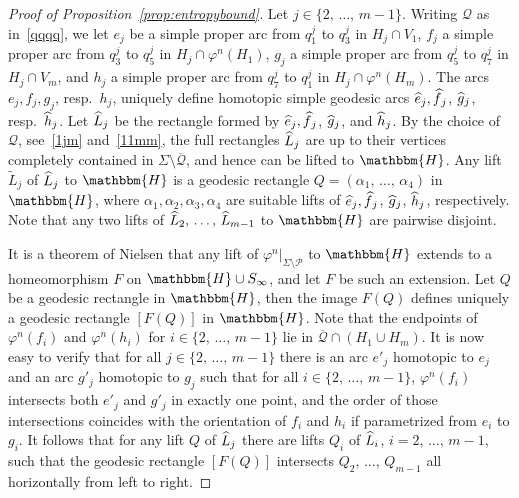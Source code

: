 \documentclass[AHL,Unicode,longabstracts,published]{cedram}
\newcommand{\Hy}{\mathbbm{H}}
\newcommand{\clP}{\mathcal{P}}
\newcommand{\clQ}{\mathcal{Q}}
\let\oldhat\hat
\renewcommand*{\hat}[1]{\mathchoice{\widehat{#1}}{\widehat{#1}}{\oldhat{#1}}{\oldhat{#1}}}
\begin{document}
\begin{proof}[Proof of Proposition~\ref{prop:entropybound}]
Let $j \in \{2,\,\ldots,\,m-1\}$. Writing $\clQ$ as in~\eqref{qqqq}, we let $e_j$ be a simple proper arc from $q_1^j$ to $q_3^j$ in $H_j \cap V_1$, $f_j$ a simple proper arc from $q_3^j$ to $q_5^j$ in $H_j \cap \varphi^n(H_1)$, $g_j$ a simple proper arc from $q_5^j$ to $q_7^j$ in $ H_j\cap V_m$, and $h_j$ a simple proper arc from $q_7^j$ to $q_1^j$ in $H_j \cap \varphi^n(H_m)$. The arcs $e_j, f_j, g_j$, resp.\ $h_j$, uniquely define homotopic simple geodesic arcs $\hat{e}_j, \hat{f}_j$, $\hat{g}_j$, resp.\ $\hat{h}_j$. Let $\hat{L}_j$ be the rectangle formed by $\hat{e}_j, \hat{f}_j$, $\hat{g}_j$, and $\hat{h}_j$. By the choice of $\clQ$, see~\eqref{1jm} and~\eqref{11mm}, the full rectangles $\hat{L}_j$ are up to their vertices completely contained in $\Sigma \setminus \overline{\clQ}$, and hence can be lifted to $\Hy$. Any lift $\widetilde{L}_j$ of $\hat{L}_j$ to $\Hy$ is a geodesic rectangle $Q=(\alpha_1,\, \ldots,\, \alpha_4)$ in $\Hy$, where $\alpha_1, \alpha_2, \alpha_3, \alpha_4$ are suitable lifts of $\hat{e}_j, \hat{f}_j$, $\hat{g}_j$, $\hat{h}_j$, respectively. Note that any two lifts of $\hat{L}_2,\,\ldots,\, \hat{L}_{m-1}$ to $\Hy$ are pairwise disjoint.


It is a theorem of Nielsen that any lift of $\varphi^n|_{\Sigma \setminus \clP}$ to $\Hy$ extends to a homeomorphism $F$ on $\Hy \cup S_{\infty}$, and let $F$ be such an extension. Let $Q$ be a geodesic rectangle in $\Hy$, then the image $F(Q)$ defines uniquely a geodesic rectangle $[F(Q)]$ in $\Hy$. Note that the endpoints of $\varphi^{n}(f_i)$ and $\varphi^{n}(h_i)$ for $i\in \{2, \,\ldots,\, m-1\}$ lie in $\overline{\clQ} \cap (H_1 \cup H_{m})$. It is now easy to verify that for all $j\in\{2, \,\ldots,\, m-1\}$ there is an arc $e'_j$ homotopic to $e_j$ and an arc $g'_j$ homotopic to $g_j$ such that for all $i\in \{2, \,\ldots,\, m-1\}$, $\varphi^n(f_i)$ intersects both $e'_j$ and $g'_j$ in exactly one point, and the order of those intersections coincides with the orientation of $f_i$ and $h_i$ if parametrized from $e_i$ to $g_i$. It follows that for any lift $Q$ of $\hat{L}_j$ there are lifts $Q_i$ of $\hat{L}_i$, $i=2,\, \ldots,\, m-1$, such that the geodesic rectangle $[F(Q)]$ intersects $Q_2, \,\ldots,\, Q_{m-1}$ all horizontally from left to right.


\end{proof}
\end{document}
